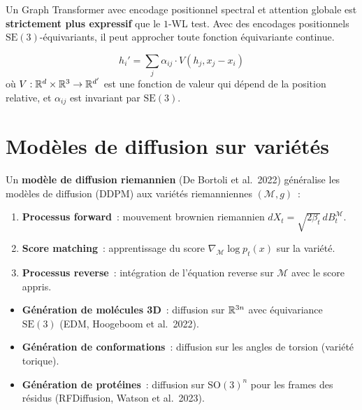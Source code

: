 \begin{theoreme}
Un Graph Transformer avec encodage positionnel spectral et attention
globale est \textbf{strictement plus expressif} que le $1$-WL test.
Avec des encodages positionnels $\mathrm{SE}(3)$-\'equivariants,
il peut approcher toute fonction \'equivariante continue.
\end{theoreme}

\begin{formules}[title=\textbf{Attention \'equivariante}]
\[
  h_i' = \sum_{j} \alpha_{ij} \cdot V(h_j, x_j - x_i)
\]
o\`u $V : \mathbb{R}^d \times \mathbb{R}^3 \to \mathbb{R}^{d'}$ est une fonction de valeur
qui d\'epend de la position relative, et $\alpha_{ij}$ est invariant
par $\mathrm{SE}(3)$.
\end{formules}

\section{Mod\`eles de diffusion sur vari\'et\'es}
\label{sec:diffusion_manifolds}

\begin{definition}
Un \textbf{mod\`ele de diffusion riemannien} (De Bortoli et al.\
2022) g\'en\'eralise les mod\`eles de diffusion (DDPM) aux
vari\'et\'es riemanniennes $(\mathcal{M}, g)$~:
\begin{enumerate}
  \item \textbf{Processus forward}~: mouvement brownien riemannien
        $dX_t = \sqrt{2\beta_t}\, dB_t^{\mathcal{M}}$.
  \item \textbf{Score matching}~: apprentissage du score
        $\nabla_{\mathcal{M}} \log p_t(x)$ sur la vari\'et\'e.
  \item \textbf{Processus reverse}~: int\'egration de l'\'equation
        reverse sur $\mathcal{M}$ avec le score appris.
\end{enumerate}
\end{definition}

\begin{exemple}
\begin{itemize}
  \item \textbf{G\'en\'eration de mol\'ecules 3D}~: diffusion sur
        $\mathbb{R}^{3n}$ avec \'equivariance $\mathrm{SE}(3)$
        (EDM, Hoogeboom et al.\ 2022).
  \item \textbf{G\'en\'eration de conformations}~: diffusion
        sur les angles de torsion (vari\'et\'e torique).
  \item \textbf{G\'en\'eration de prot\'eines}~: diffusion sur
        $\mathrm{SO}(3)^n$ pour les frames des r\'esidus
        (RFDiffusion, Watson et al.\ 2023).
\end{itemize}
\end{exemple}

